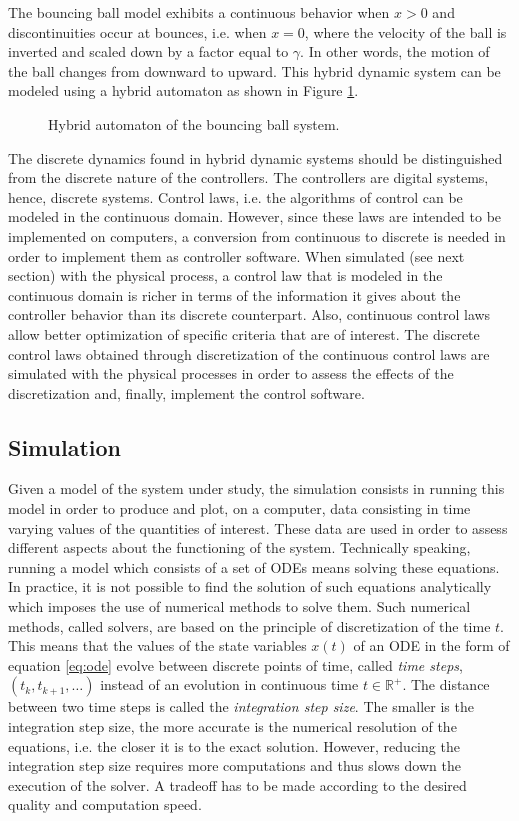 The bouncing ball model exhibits a continuous behavior when $x > 0$ and discontinuities occur at bounces, i.e. when $x = 0$, where the velocity of the ball is inverted and scaled down by a factor equal to $\gamma$. In other words, the motion of the ball changes from downward to upward. This hybrid dynamic system can be modeled using a hybrid automaton as shown in Figure \ref{fig:bbautomaton}.

\begin{figure}[phbt]
\centering

\caption{Hybrid automaton of the bouncing ball system.}
\label{fig:bbautomaton}
\end{figure}

The discrete dynamics found in hybrid dynamic systems should be distinguished from the discrete nature of the controllers. The controllers are digital systems, hence, discrete systems. Control laws, i.e. the algorithms of control can be modeled in the continuous domain. However, since these laws are intended to be implemented on computers, a conversion from continuous to discrete is needed in order to implement them as controller software. When simulated (see next section) with the physical process, a control law that is modeled in the continuous domain is richer in terms of the information it gives about the controller behavior than its discrete counterpart. Also, continuous control laws allow better optimization of specific criteria that are of interest. The discrete control laws obtained through discretization of the continuous control laws are simulated with the physical processes in order to assess the effects of the discretization and, finally, implement the control software.

\subsection{Simulation}

Given a model of the system under study, the simulation consists in running this model in order to produce and plot, on a computer, data consisting in time varying values of the quantities of interest. These data are used in order to assess different aspects about the functioning of the system. Technically speaking, running a model which consists of a set of ODEs means solving these equations. In practice, it is not possible to find the solution of such equations analytically which imposes the use of numerical methods to solve them. Such numerical methods, called solvers, are based on the principle of discretization of the time $t$. This means that the values of the state variables $x(t)$ of an ODE in the form of equation \ref{eq:ode} evolve between discrete points of time, called \textit{time steps}, $(t_k, t_{k+1}, \ldots)$ instead of an evolution in continuous time $t \in \mathbb{R}^+$. The distance between two time steps is called the \textit{integration step size}. The smaller is the integration step size, the more accurate is the numerical resolution of the equations, i.e. the closer it is to the exact solution. However, reducing the integration step size requires more computations and thus slows down the execution of the solver. A tradeoff has to be made according to the desired quality and computation speed.

